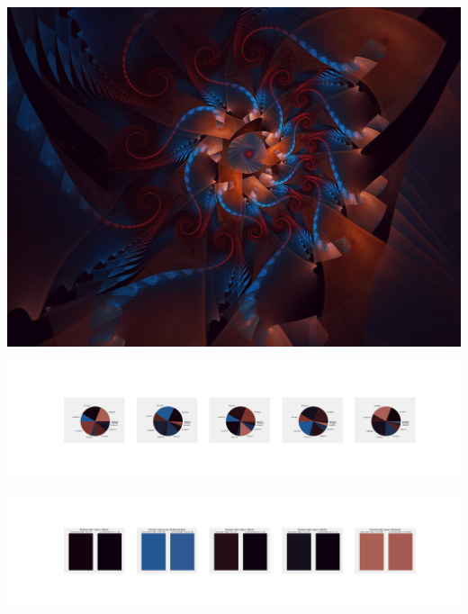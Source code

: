 \documentclass[11pt]{article}
\begin{document}
\begin{landscape}
    \begin{center}
    \includegraphics[width=\textwidth]{./nbimg/file (171).jpg}
    \end{center}

    \begin{center}
    \includegraphics[width=250mm]{./nbimg/pie-80.jpg}
    \end{center}

    \begin{center}
    \includegraphics[width=250mm]{./nbimg/peak-80.jpg}
    \end{center}
    


\end{landscape}
\end{document}
